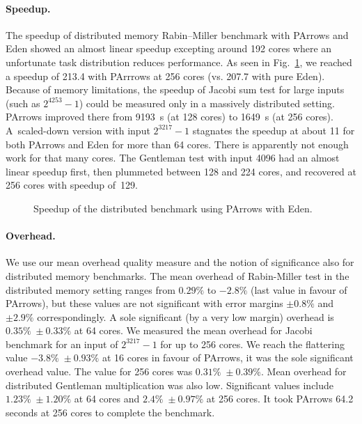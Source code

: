 \documentclass{jfp1}
\begin{document}
\paragraph{Speedup.}
The speedup of distributed memory Rabin--Miller benchmark with PArrows and Eden showed an almost 
linear speedup excepting around 192 cores where an unfortunate task distribution reduces performance.
As seen in Fig.~\ref{fig:rabinMillerDistSpeedup}, we reached a speedup of 213.4 with PArrrows at 256 cores (vs. 207.7 with pure Eden). Because of memory limitations, the speedup of Jacobi sum test for large inputs (such as $2^{4253}-1$) could be measured only in a massively distributed setting. PArrows improved there from \SI{9193}{\second} (at 128 cores) to \SI{1649}{\second} (at 256 cores). A~scaled-down version with input $2^{3217}-1$ stagnates the speedup at about 11 for both PArrows and Eden for more than 64 cores. There is apparently not enough work for that many cores. The Gentleman test with input 4096 had an almost linear speedup first, then plummeted between 128 and 224 cores, and recovered at 256 cores with speedup of~129.

\begin{figure}[ht]
	\centering
	\caption[Speedup distributed Rabin--Miller]{Speedup of the distributed \rmtest benchmark using PArrows with Eden.}
	\label{fig:rabinMillerDistSpeedup}
\end{figure}

\paragraph{Overhead.}
We use our mean overhead quality measure and the notion of significance also for distributed memory benchmarks. The mean overhead of Rabin-Miller test in the distributed memory setting ranges from $0.29\%$ to $-2.8\%$ (last value in favour of PArrows), but these values are not significant with error margins $\pm 0.8\%$ and $\pm 2.9\%$ correspondingly. A sole significant (by a very low margin) overhead is $0.35\% \; \pm 0.33\%$ at 64 cores.
We measured the mean overhead for Jacobi benchmark for an input of $2^{3217}-1$ for up to 256 cores.
We reach the flattering value $-3.8\% \; \pm 0.93\%$ at 16 cores in favour of PArrows, it was the sole significant overhead value. The  value for 256 cores was $0.31\% \; \pm 0.39\%$.
Mean overhead for distributed Gentleman multiplication was also low. Significant values include $1.23\% \; \pm 1.20\%$ at 64 cores and $2.4\% \; \pm 0.97\%$ at 256 cores. It took PArrows 64.2 seconds at 256 cores to complete the benchmark.
\end{document}
